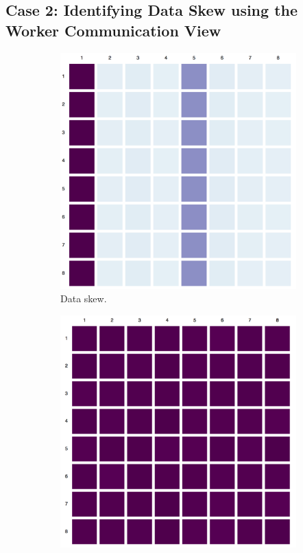 \documentclass{chi2009}
\newcommand*{\network}{Worker Communication\xspace}
\begin{document}

\subsection{Case 2: Identifying Data Skew using the \network View}

\begin{figure}[ht]
  \centering
  \begin{subfigure}[b]{0.49\columnwidth}
    \includegraphics[width=\columnwidth]{images/skew}
    \caption{Data skew.}
    \label{fig:skew}
  \end{subfigure}
  \begin{subfigure}[b]{0.49\columnwidth}
    \includegraphics[width=\columnwidth]{images/no-skew}

\end{subfigure}
\end{figure}
\end{document}
